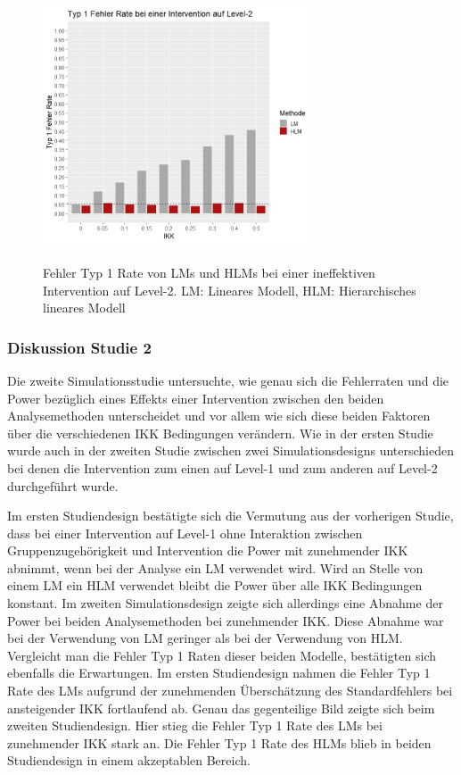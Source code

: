 \documentclass[12pt]{article}\usepackage[]{graphicx}\usepackage[]{color}
\begin{document}
\begin{figure}[t!]
\centering
\captionsetup{width=8cm}
\includegraphics[width=8cm, height=8cm]{results_error_lvl2}
\caption{Fehler Typ 1 Rate von LMs und HLMs bei einer ineffektiven Intervention auf Level-2. LM: Lineares Modell, HLM: Hierarchisches lineares Modell}
\label{fig:results_error_lvl2}
\end{figure}

\subsubsection{Diskussion Studie 2}
Die zweite Simulationsstudie untersuchte, wie genau sich die Fehlerraten und die Power bezüglich eines Effekts einer Intervention zwischen den beiden Analysemethoden unterscheidet und vor allem wie sich diese beiden Faktoren über die verschiedenen IKK Bedingungen verändern. Wie in der ersten Studie wurde auch in der zweiten Studie zwischen zwei Simulationsdesigns unterschieden bei denen die Intervention zum einen auf Level-1 und zum anderen auf Level-2 durchgeführt wurde.

Im ersten Studiendesign bestätigte sich die Vermutung aus der vorherigen Studie, dass bei einer Intervention auf Level-1 ohne Interaktion zwischen Gruppenzugehörigkeit und Intervention die Power mit zunehmender IKK abnimmt, wenn bei der Analyse ein LM verwendet wird. Wird an Stelle von einem LM ein HLM verwendet bleibt die Power über alle IKK Bedingungen konstant. Im zweiten Simulationsdesign zeigte sich allerdings eine Abnahme der Power bei beiden Analysemethoden bei zunehmender IKK. Diese Abnahme war bei der Verwendung von LM geringer als bei der Verwendung von HLM. Vergleicht man die Fehler Typ 1 Raten dieser beiden Modelle, bestätigten sich ebenfalls die Erwartungen. Im ersten Studiendesign nahmen die Fehler Typ 1 Rate des LMs aufgrund der zunehmenden Überschätzung des Standardfehlers bei ansteigender IKK fortlaufend ab. Genau das gegenteilige Bild zeigte sich beim zweiten Studiendesign. Hier stieg die Fehler Typ 1 Rate des LMs bei zunehmender IKK stark an. Die Fehler Typ 1 Rate des HLMs blieb in beiden Studiendesign in einem akzeptablen Bereich. 
\end{document}
